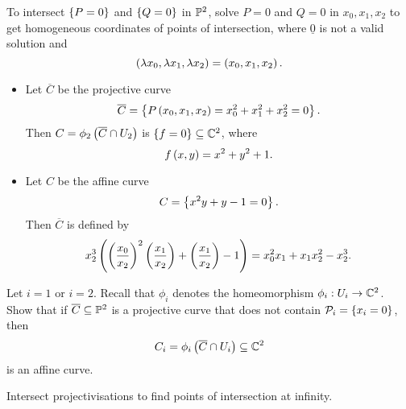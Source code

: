 \begin{remark*}
To intersect $ \cb{P = 0} $ and $ \cb{Q = 0} $ in $ \P^2 $, solve $ P = 0 $ and $ Q = 0 $ in $ x_0, x_1, x_2 $ to get homogeneous coordinates of points of intersection, where $ \underline{0} $ is not a valid solution and
$$ \rb{\lambda x_0, \lambda x_1, \lambda x_2} = \rb{x_0, x_1, x_2}. $$
\end{remark*}

\begin{example}
\hfill
\begin{itemize}
\item Let $ \overline{C} $ be the projective curve
$$ \overline{C} = \cb{P\rb{x_0, x_1, x_2} = x_0^2 + x_1^2 + x_2^2 = 0}. $$
Then $ C = \phi_2\rb{\overline{C} \cap U_2} $ is $ \cb{f = 0} \subseteq \C^2 $, where
$$ f\rb{x, y} = x^2 + y^2 + 1. $$
\item Let $ C $ be the affine curve
$$ C = \cb{x^2y + y - 1 = 0}. $$
Then $ \overline{C} $ is defined by
$$ x_2^3\rb{\rb{\dfrac{x_0}{x_2}}^2\rb{\dfrac{x_1}{x_2}} + \rb{\dfrac{x_1}{x_2}} - 1} = x_0^2x_1 + x_1x_2^2 - x_2^3. $$
\end{itemize}
\end{example}

\pagebreak

\begin{exercise}
Let $ i = 1 $ or $ i = 2 $. Recall that $ \phi_i $ denotes the homeomorphism $ \phi_i : U_i \to \C^2 $. Show that if $ \overline{C} \subseteq \P^2 $ is a projective curve that does not contain $ \PP_i = \cb{x_i = 0} $, then
$$ C_i = \phi_i\rb{\overline{C} \cap U_i} \subseteq \C^2 $$
is an affine curve.
\end{exercise}


Intersect projectivisations to find points of intersection at infinity.

